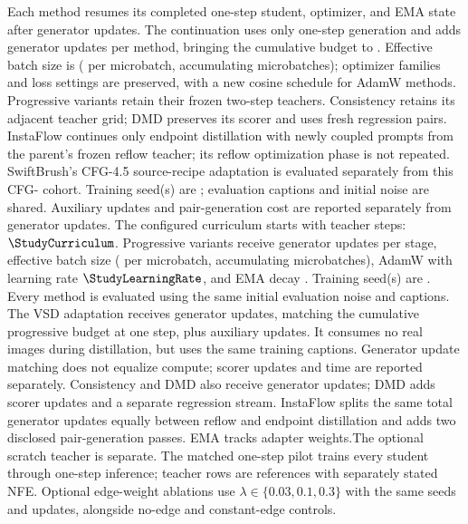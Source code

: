 \documentclass[10pt,twocolumn,letterpaper]{article}
\begin{document}
\ifStudyContinuation
Each method resumes its completed one-step student, optimizer, and EMA state
after \StudyParentUpdates{} generator updates. The continuation uses only
one-step generation and adds \StudyStageUpdates{} generator updates per method,
bringing the cumulative budget to \StudyTotalUpdates{}. Effective batch size is
\StudyBatchSize{} (\StudyMicroBatch{} per microbatch, accumulating
\StudyAccumulation{} microbatches); optimizer families and loss settings are
preserved, with a new cosine schedule for AdamW methods. Progressive variants
retain their frozen two-step teachers. Consistency retains its adjacent teacher
grid; DMD preserves its scorer and uses fresh regression pairs. InstaFlow
continues only endpoint distillation with newly coupled prompts from the
parent's frozen reflow teacher; its reflow optimization phase is not repeated.
SwiftBrush's CFG-4.5 source-recipe adaptation is evaluated separately from this
CFG-\StudyGuidance{} cohort. Training seed(s) are \StudySeeds{}; evaluation
captions and initial noise are shared. Auxiliary updates and pair-generation
cost are reported separately from generator updates.
\else
The configured curriculum starts with \StudyInitialSteps{} teacher steps:
$\StudyCurriculum$.
Progressive variants receive \StudyStageUpdates{} generator updates per stage,
effective batch size \StudyBatchSize{} (\StudyMicroBatch{} per microbatch, accumulating
\StudyAccumulation{} microbatches), AdamW with learning rate $\StudyLearningRate$,
and EMA decay \StudyEMADecay{}.
Training seed(s) are \StudySeeds{}. Every method is evaluated using
the same initial evaluation noise\ifStudySD{} and captions\fi. The VSD adaptation receives \StudyVSDUpdates{} generator
updates, matching the cumulative progressive budget at one step, plus \StudyVSDUpdates{}
auxiliary updates. It consumes no real images during distillation\ifStudySD{}, but uses the same training captions\fi. Generator
update matching does not equalize compute; scorer updates and time
are reported separately. \ifStudySD
Consistency and DMD also receive \StudyVSDUpdates{} generator updates;
DMD adds \StudyVSDUpdates{} scorer updates and a separate regression stream.
InstaFlow splits the same total generator updates equally between reflow and
endpoint distillation and adds two disclosed pair-generation passes.
EMA tracks adapter weights.\else The optional scratch teacher is separate.\fi
\fi
\ifStudySD The matched one-step pilot trains every student through one-step inference;
teacher rows are references with separately stated NFE. Optional edge-weight
ablations use $\lambda\in\{0.03,0.1,0.3\}$ with the same seeds and updates,
alongside no-edge and constant-edge controls.\fi
\end{document}
